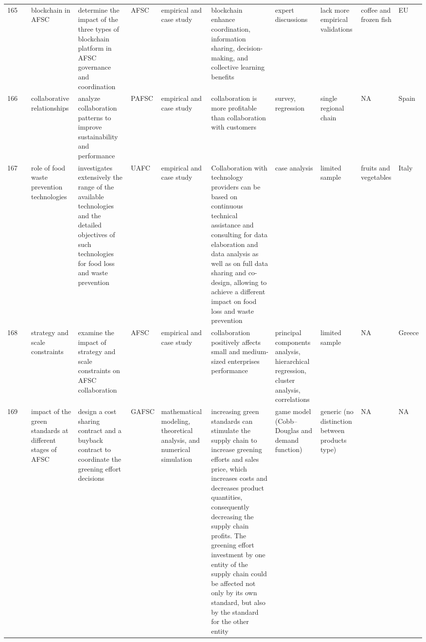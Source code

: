 \documentclass[a4paper,10pt]{article}
\begin{document}
\begin{landscape}
\begin{small}
\begin{longtable}{p{0.5cm} p{2cm} p{2.5cm} p{4cm} p{1cm} p{2.5cm} p{5.5cm} p{2.5cm} p{2.5cm} p{1.8cm} p{1.5cm}}
165 & \textcite{Kramer162} &blockchain in AFSC & determine the impact of the three types of blockchain platform in AFSC governance and coordination  &AFSC & empirical and case study& blockchain enhance coordination, information sharing, decision-making, and collective learning benefits &expert discussions   & lack more empirical validations & coffee  and frozen fish & EU   \\
166 & \textcite{Pérez165} &collaborative relationships & analyze collaboration patterns to improve sustainability and performance&PAFSC & empirical and case study& collaboration is more profitable than collaboration with customers &survey, regression   & single regional chain& NA& Spain  \\
167 & \textcite{Ciccullo169} &role of food waste prevention technologies & investigates extensively the range of the available technologies and the detailed objectives of such technologies for food loss and waste prevention&UAFC & empirical and case study&Collaboration with technology providers can be based on continuous technical assistance and consulting for data elaboration and data analysis as well as on full data sharing and co-design, allowing to achieve a different impact on food loss and waste prevention &case analysis   & limited sample&  fruits and vegetables & Italy  \\
168 & \textcite{Zaridis170} &strategy and scale constraints & examine the impact of strategy and scale constraints on AFSC collaboration &AFSC & empirical and case study& collaboration positively affects small and medium-sized enterprises performance & principal components analysis, hierarchical regression, cluster analysis, correlations & limited sample &NA& Greece  \\
169 & \textcite{Cao171} &impact of the green standards at different stages of AFSC & design a cost sharing contract and a buyback contract to coordinate the greening effort decisions &GAFSC & mathematical modeling, theoretical analysis, and numerical simulation & increasing green standards can stimulate the supply chain to increase greening efforts and sales price, which increases costs and decreases product quantities, consequently decreasing the supply chain profits. The greening effort investment by one entity of the supply chain could be affected not only by its own standard, but also by the standard for the other entity &game model (Cobb–Douglas and  demand function)& generic (no distinction between products type)& NA& NA  \\

\end{longtable}
\end{small}
\end{landscape}
\end{document}
